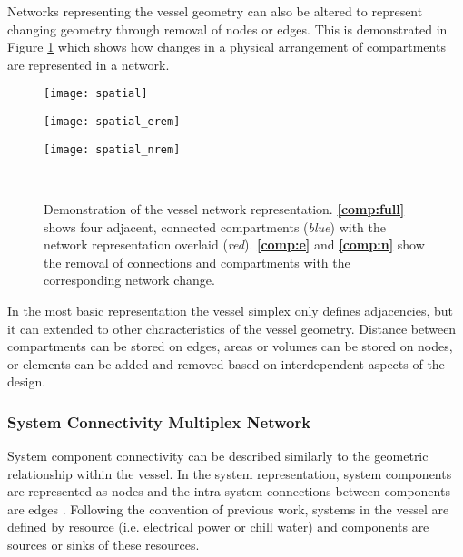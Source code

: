 \documentclass[preprint,12pt]{elsarticle}
\begin{document}
Networks representing the vessel geometry can also be altered to represent changing geometry through removal of nodes or edges. This is demonstrated in Figure \ref{fig:comp} which shows how changes in a physical arrangement of compartments are represented in a network. 

\begin{figure}
	\begin{minipage}{.32\linewidth}
		\centering
		\texttt{[image: spatial]}
		\label{comp:full}
	\end{minipage}
	\begin{minipage}{.33\linewidth}
		\centering
		\texttt{[image: spatial\_erem]}
		\label{comp:e}
	\end{minipage}
	\begin{minipage}{.33\linewidth}
		\centering
		\texttt{[image: spatial\_nrem]}
		\label{comp:n}
	\end{minipage}\\[1ex]
	\caption{Demonstration of the vessel network representation. \textbf{\ref{comp:full}} shows four adjacent, connected compartments (\textit{blue}) with the network representation overlaid (\textit{red}). \textbf{\ref{comp:e}} and \textbf{\ref{comp:n}} show the removal of connections and compartments with the corresponding network change.}
	\label{fig:comp}
\end{figure}

In the most basic representation the vessel simplex only defines adjacencies, but it can extended to other characteristics of the vessel geometry. Distance between compartments can be stored on edges, areas or volumes can be stored on nodes, or elements can be added and removed based on interdependent aspects of the design.


\subsubsection{System Connectivity Multiplex Network} \label{sec:sysmodel}
System component connectivity can be described similarly to the geometric relationship within the vessel. In the system representation, system components are represented as nodes and the intra-system connections between components are edges \citep{Rigterink2014,Dellsy2015}. Following the convention of previous work, systems in the vessel are defined by resource (i.e. electrical power or chill water) and components are sources or sinks of these resources.
\end{document}
